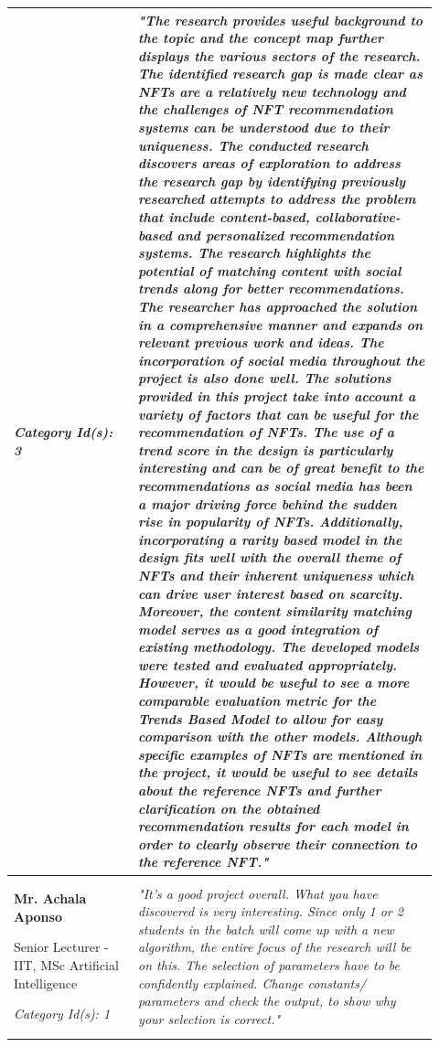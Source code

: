 \begin{longtable}{|p{0.27\linewidth}|p{0.655\linewidth}|}
\textit{Category Id(s): 3}
 & 
 \textit{"The research provides useful background to the topic and the concept map further displays the various sectors of the research. The identified research gap is made clear as NFTs are a relatively new technology and the challenges of NFT recommendation systems can be understood due to their uniqueness. 
 The conducted research discovers areas of exploration to address the research gap by identifying previously researched attempts to address the problem that include content-based, collaborative-based and personalized recommendation systems. The research highlights the potential of matching content with social trends along for better recommendations. 
 The researcher has approached the solution in a comprehensive manner and expands on relevant previous work and ideas. The incorporation of social media throughout the project is also done well.
 The solutions provided in this project take into account a variety of factors that can be useful for the recommendation of NFTs. The use of a trend score in the design is particularly interesting and can be of great benefit to the recommendations as social media has been a major driving force behind the sudden rise in popularity of NFTs. Additionally, incorporating a rarity based model in the design fits well with the overall theme of NFTs and their inherent uniqueness which can drive user interest based on scarcity. Moreover, the content similarity matching model serves as a good integration of existing methodology.
 The developed models were tested and evaluated appropriately. However, it would be useful to see a more comparable evaluation metric for the Trends Based Model to allow for easy comparison with the other models.
 Although specific examples of NFTs are mentioned in the project, it would be useful to see details about the reference NFTs and further clarification on the obtained recommendation results for each model in order to clearly observe their connection to the reference NFT."}
 \\
\hline
\textbf{Mr. Achala Aponso}

Senior Lecturer - IIT, MSc Artificial Intelligence 

\textit{Category Id(s): 1}
 & 
 \textit{"It's a good project overall. What you have discovered is very interesting.
Since only 1 or 2 students in the batch will come up with a new algorithm, the entire focus of the research will be on this.
The selection of parameters have to be confidently explained. Change constants/ parameters and check the output, to show why your selection is correct."}
 \\


\end{longtable}
